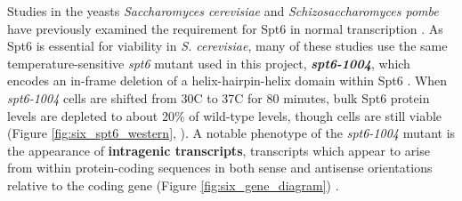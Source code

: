 Studies in the yeasts \textit{Saccharomyces cerevisiae} and \textit{Schizosaccharomyces pombe} have previously examined the requirement for Spt6 in normal transcription \citep{cheung2008, degennaro2013, kaplan2003, pathak2018, uwimana2017, vanbakel2013}.
As Spt6 is essential for viability in \textit{S. cerevisiae}, many of these studies use the same temperature-sensitive \textit{spt6} mutant used in this project, \textbf{\textit{spt6-1004}}, which encodes an in-frame deletion of a helix-hairpin-helix domain within Spt6 \citep{kaplan2003}.
When \textit{spt6-1004} cells are shifted from 30\textdegree C to 37\textdegree C for 80 minutes, bulk Spt6 protein levels are depleted to about 20\% of wild-type levels, though cells are still viable  (Figure \ref{fig:six_spt6_western}, \citep{kaplan2003}).
A notable phenotype of the \textit{spt6-1004} mutant is the appearance of \textbf{intragenic transcripts}, transcripts which appear to arise from within protein-coding sequences in both sense and antisense orientations relative to the coding gene (Figure \ref{fig:six_gene_diagram}) \citep{cheung2008, degennaro2013, kaplan2003, uwimana2017}.

